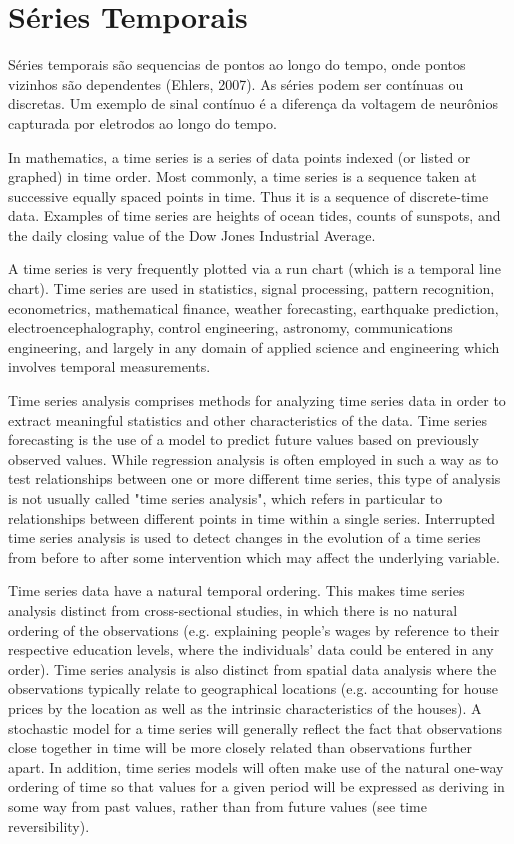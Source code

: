 \chapter{Séries Temporais}

Séries temporais são sequencias de pontos ao longo do tempo, onde pontos vizinhos são dependentes (Ehlers, 2007). 
As séries podem ser contínuas ou discretas. Um exemplo de sinal contínuo é a diferença da voltagem de neurônios
capturada por eletrodos ao longo do tempo. 

In mathematics, a time series is a series of data points indexed (or listed or graphed) in time order. Most commonly, a time series is a sequence taken at successive equally spaced points in time. Thus it is a sequence of discrete-time data. Examples of time series are heights of ocean tides, counts of sunspots, and the daily closing value of the Dow Jones Industrial Average.

A time series is very frequently plotted via a run chart (which is a temporal line chart). Time series are used in statistics, signal processing, pattern recognition, econometrics, mathematical finance, weather forecasting, earthquake prediction, electroencephalography, control engineering, astronomy, communications engineering, and largely in any domain of applied science and engineering which involves temporal measurements.

Time series analysis comprises methods for analyzing time series data in order to extract meaningful statistics and other characteristics of the data. Time series forecasting is the use of a model to predict future values based on previously observed values. While regression analysis is often employed in such a way as to test relationships between one or more different time series, this type of analysis is not usually called "time series analysis", which refers in particular to relationships between different points in time within a single series. Interrupted time series analysis is used to detect changes in the evolution of a time series from before to after some intervention which may affect the underlying variable.

Time series data have a natural temporal ordering. This makes time series analysis distinct from cross-sectional studies, in which there is no natural ordering of the observations (e.g. explaining people's wages by reference to their respective education levels, where the individuals' data could be entered in any order). Time series analysis is also distinct from spatial data analysis where the observations typically relate to geographical locations (e.g. accounting for house prices by the location as well as the intrinsic characteristics of the houses). A stochastic model for a time series will generally reflect the fact that observations close together in time will be more closely related than observations further apart. In addition, time series models will often make use of the natural one-way ordering of time so that values for a given period will be expressed as deriving in some way from past values, rather than from future values (see time reversibility).

